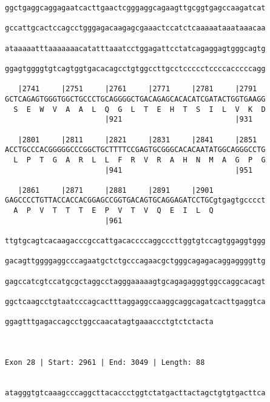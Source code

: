 \documentclass{article}
\begin{document}
\begin{Verbatim}
ggctgaggcaggagaatcacttgaactcgggaggcagaagttgcggtgagccaagatcat
                                                            
gccattgcactccagcctgggagacaagagcgaaactccatctcaaaaataaataaacaa
                                                            
ataaaaatttaaaaaaacatatttaaatcctggagattcctatcagaggagtgggcagtg
                                                            
ggagtggggtgtcagtggtgacacagcctgtggccttgcctccccctccccacccccagg
                                                            
   |2741     |2751     |2761     |2771     |2781     |2791  
GCTCAGAGTGGGTGGCTGCCCTGCAGGGGCTGACAGAGCACACATCGATACTGGTGAAGG
  S  E  W  V  A  A  L  Q  G  L  T  E  H  T  S  I  L  V  K  D
                       |921                          |931   
  
   |2801     |2811     |2821     |2831     |2841     |2851  
ACCTGCCCACGGGGGCCCGGCTGCTTTTCCGAGTGCGGGCACACAATATGGCAGGGCCTG
  L  P  T  G  A  R  L  L  F  R  V  R  A  H  N  M  A  G  P  G
                       |941                          |951   
  
   |2861     |2871     |2881     |2891     |2901            
GAGCCCCTGTTACCACCACGGAGCCGGTGACAGTGCAGGAGATCCTGCgtgagtgcccct
  A  P  V  T  T  T  E  P  V  T  V  Q  E  I  L  Q            
                       |961                                 
  
ttgtgcagtcacaagacccgccattgacaccccaggcccttggtgtccagtggaggtggg
                                                            
gacagttggggaggcccagaatgctctgcccagaacgctgggcagagacaggaggggttg
                                                            
gagccatcgtccatgcgctaggcctagggaaaaagtgcagagagggtggccaggcacagt
                                                            
ggctcaagcctgtaatcccagcactttaggaggccaaggcaggcagatcacttgaggtca
                                                            
ggagtttgagaccagcctggccaacatagtgaaaccctgtctctacta
                                                
                                                
 
Exon 28 | Start: 2961 | End: 3049 | Length: 88


atagggtgtcaaagcccaggcttacaccctggtctatgacttactagctgtgtgacttca
                                                            

\end{Verbatim}
\end{document}
